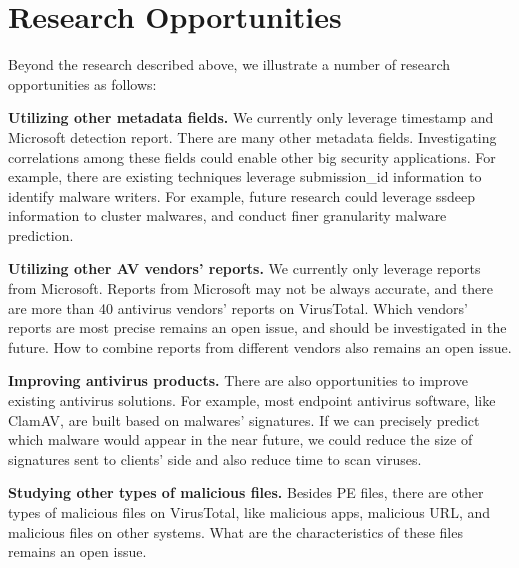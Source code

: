 \section{Research Opportunities}
\label{sec:oppo}
Beyond the research described above, we illustrate a number of research opportunities as follows: 

{\bf Utilizing other metadata fields.} 
We currently only leverage timestamp and Microsoft detection report. 
There are many other metadata fields. 
Investigating correlations among these fields could enable other big security applications. 
For example, there are existing techniques leverage submission\_id information to identify malware writers. 
For example, future research could leverage ssdeep information to cluster malwares, and conduct finer granularity malware prediction. 

{\bf Utilizing other AV vendors’ reports.}
We currently only leverage reports from Microsoft. 
Reports from Microsoft may not be always accurate, 
and there are more than 40 antivirus vendors' reports on VirusTotal. 
Which vendors' reports are most precise remains an open issue, 
and should be investigated in the future. How to combine reports from different vendors also remains an open issue. 

{\bf Improving antivirus products.} 
There are also opportunities to improve existing antivirus solutions. 
For example, most endpoint antivirus software, like ClamAV, are built based on malwares' signatures.
If we can precisely predict which malware would appear in the near future, 
we could reduce the size of signatures sent to clients' side and also reduce time to scan viruses. 

{\bf Studying other types of malicious files. }
Besides PE files, there are other types of malicious files on VirusTotal, like malicious apps, 
malicious URL, and malicious files on other systems. 
What are the characteristics of these files remains an open issue. 
